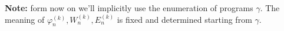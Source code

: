 \textbf{Note:} form now on we'll implicitly use the enumeration of
programs $\gamma$. The meaning of
$\varphi_n^{(k)}, W_n^{(k)}, E_n^{(k)}$ is fixed and determined
starting from $\gamma$.







